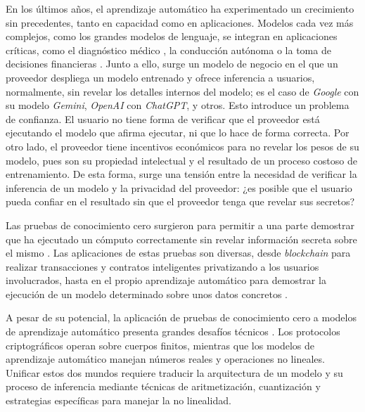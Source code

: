 \documentclass[a4paper, 11pt]{article}
\begin{document}
En los últimos años, el aprendizaje automático ha experimentado un crecimiento sin precedentes, tanto
en capacidad como en aplicaciones. Modelos cada vez más complejos, como los grandes modelos de
lenguaje, se integran en aplicaciones críticas, como el diagnóstico médico \cite{maity2025largelanguagemodels},
la conducción autónoma \cite{li2025applications} o la toma de decisiones financieras \cite{darwish2025stock}.
Junto a ello, surge un modelo de negocio en el que un proveedor despliega un modelo entrenado y ofrece
inferencia a usuarios, normalmente, sin revelar los detalles internos del modelo; es el caso de
\textit{Google} con su modelo \textit{Gemini}, \textit{OpenAI} con \textit{ChatGPT}, y otros. Esto
introduce un problema de confianza. El usuario no tiene forma de verificar que el proveedor está
ejecutando el modelo que afirma ejecutar, ni que lo hace de forma correcta. Por otro lado, el
proveedor tiene incentivos económicos para no revelar los pesos de su modelo, pues son su propiedad
intelectual y el resultado de un proceso costoso de entrenamiento. De esta forma, surge una tensión
entre la necesidad de verificar la inferencia de un modelo y la privacidad del proveedor: ¿es posible
que el usuario pueda confiar en el resultado sin que el proveedor tenga que revelar sus secretos?

Las pruebas de conocimiento cero surgieron para permitir a una parte demostrar que ha ejecutado un
cómputo correctamente sin revelar información secreta sobre el mismo \cite{goldreich2001foundations}.
Las aplicaciones de estas pruebas son diversas, desde \textit{blockchain} para realizar transacciones
y contratos inteligentes privatizando a los usuarios involucrados, hasta en el propio aprendizaje
automático para demostrar la ejecución de un modelo determinado sobre unos datos concretos \cite{lavin2026survey}.

A pesar de su potencial, la aplicación de pruebas de conocimiento cero a modelos de aprendizaje
automático presenta grandes desafíos técnicos \cite{peng2026survey}. Los protocolos criptográficos
operan sobre cuerpos finitos, mientras que los modelos de aprendizaje automático manejan números
reales y operaciones no lineales. Unificar estos dos mundos requiere traducir la arquitectura de un
modelo y su proceso de inferencia mediante técnicas de aritmetización, cuantización y estrategias
específicas para manejar la no linealidad.
\end{document}
